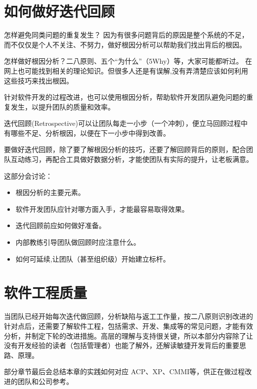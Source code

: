 \documentclass{book}        %
\providecommand{\tightlist}{%
  \setlength{\itemsep}{0pt}\setlength{\parskip}{0pt}}
\begin{document}


\part{如何做好迭代回顾}怎样避免同类问题的重复发生？ 因为有很多问题背后的原因是整个系统的不足， 而不仅仅是个人不关注、不努力，做好根因分析可以帮助我们找出背后的根因。

怎样做好根因分析？二八原则、五个“为什么”（5Why）等，大家可能都听过。 在网上也可能找到相关的理论知识。但很多人还是有误解,没有弄清楚应该如何利用这些技巧来找出根因。

针对软件开发的过程改进，也可以使用根因分析，帮助软件开发团队避免问题的重复发生，以提升团队的质量和效率。

迭代回顾(Retrospective)可以让团队每走一小步（一个冲刺），便立马回顾过程中有哪些不足、分析根因，以便在下一小步中得到改善。

要做好迭代回顾，除了要了解根因分析的技巧，还要了解回顾背后的原则，配合团队互动练习，再配合工具做好数据分析，才能使团队有实际的提升，让老板满意。

这部分会讨论：

\begin{itemize}
\tightlist
\item
  根因分析的主要元素。
\item
  软件开发团队应针对哪方面入手，才能最容易取得效果。
\item
  迭代回顾前应如何做好准备。
\item
  内部教练引导团队做回顾时应注意什么。
\item
  如何可延续,让团队（甚至组织级）开始建立标杆。
\end{itemize}





\part{软件工程质量}当团队已经开始每次迭代做回顾，分析缺陷与返工工作量，按二八原则识别改进的针对点后，还需要了解软件工程，包括需求、开发、集成等的常见问题，才能有效分析，并制定下轮的改进措施。高层的理解与支持很关键，所以本部分内容除了让没有开发经验的读者（包括管理者）也能了解外，还解读敏捷开发背后的重要思路、原理。

部分章节最后会总结本章的实践如何对应 ACP、XP、CMMI等，供正在做过程改进的团队和公司参考。
\end{document}

